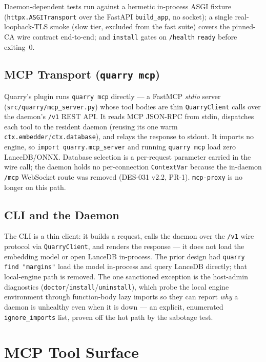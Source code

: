 \documentclass[a4paper,10pt]{article}
\newcommand{\modpath}[1]{\texttt{src/quarry/#1}}
\begin{document}
Daemon-dependent tests run against a hermetic in-process ASGI fixture
(\texttt{httpx.ASGITransport} over the FastAPI \texttt{build\_app}, no
socket); a single real-loopback-TLS smoke (slow tier, excluded from the fast
suite) covers the pinned-CA wire contract end-to-end; and \texttt{install}
gates on \texttt{/health} \texttt{ready} before exiting~0.

\subsection{MCP Transport (\texttt{quarry mcp})}

Quarry's plugin runs \texttt{quarry mcp} directly --- a FastMCP
\emph{stdio} server (\modpath{mcp\_server.py}) whose tool bodies
are thin \texttt{QuarryClient} calls over the daemon's \texttt{/v1} REST
API.  It reads MCP JSON-RPC from stdin, dispatches each tool to the
resident daemon (reusing its one warm \texttt{ctx.embedder}/\texttt{ctx.database}),
and relays the response to stdout.  It imports no engine, so
\texttt{import quarry.mcp\_server} and running \texttt{quarry mcp} load
zero LanceDB/ONNX.  Database selection is a per-request parameter carried
in the wire call; the daemon holds no per-connection \texttt{ContextVar}
because the in-daemon \texttt{/mcp} WebSocket route was removed (DES-031
v2.2, PR-1).  \texttt{mcp-proxy} is no longer on this path.

\subsection{CLI and the Daemon}

The CLI is a thin client: it builds a request, calls the daemon over the
\texttt{/v1} wire protocol via \texttt{QuarryClient}, and renders the
response --- it does not load the embedding model or open LanceDB
in-process.  The prior design had \texttt{quarry find "margins"} load the
model in-process and query LanceDB directly; that local-engine path is
removed.  The one sanctioned exception is the host-admin diagnostics
(\texttt{doctor}/\texttt{install}/\texttt{uninstall}), which probe the
local engine environment through function-body lazy imports so they can
report \emph{why} a daemon is unhealthy even when it is down --- an
explicit, enumerated \texttt{ignore\_imports} list, proven off the hot
path by the sabotage test.

\section{MCP Tool Surface}
\end{document}
